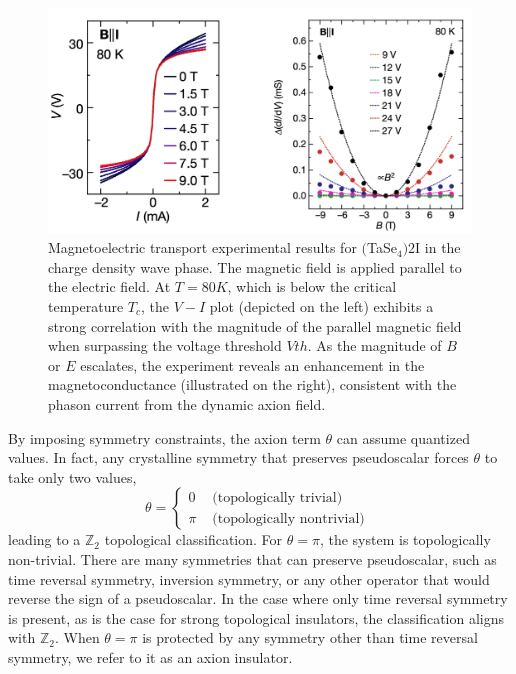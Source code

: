 \begin{figure}[h]
    \centering
    \includegraphics[width =\textwidth]{images/phason.png}
    \caption{Magnetoelectric transport experimental results for $($TaSe$_4)2$I in the charge density wave phase. The magnetic field is applied parallel to the electric field. At $T=80K$, which is below the critical temperature $T_c$, the $V-I$ plot (depicted on the left) exhibits a strong correlation with the magnitude of the parallel magnetic field when surpassing the voltage threshold $V{th}$. As the magnitude of $B$ or $E$ escalates, the experiment reveals an enhancement in the magnetoconductance (illustrated on the right), consistent with the phason current from the dynamic axion field. \cite{shi2021charge}}
    \label{fig:megnetoelectric}
\end{figure}



By imposing symmetry constraints, the axion term 
$\theta$ can assume quantized values. In fact, any crystalline symmetry that preserves pseudoscalar forces 
$\theta$ to take only two values, 
\begin{equation}
\theta= \begin{cases}0 & \text { (topologically trivial) } \\ \pi & \text { (topologically nontrivial) }\end{cases}
\end{equation}
leading to a $\mathbb{Z}_2$ topological classification. For $\theta=\pi$, the system is topologically non-trivial. There are many symmetries that can preserve pseudoscalar, such as time reversal symmetry, inversion symmetry, or any other operator that would reverse the sign of a pseudoscalar\cite{vanderbilt2018berry}. In the case where only time reversal symmetry is present, as is the case for strong topological insulators, the classification aligns with $\mathbb{Z}_2$. When $\theta=\pi$ is protected by any symmetry other than time reversal symmetry, we refer to it as an axion insulator.

